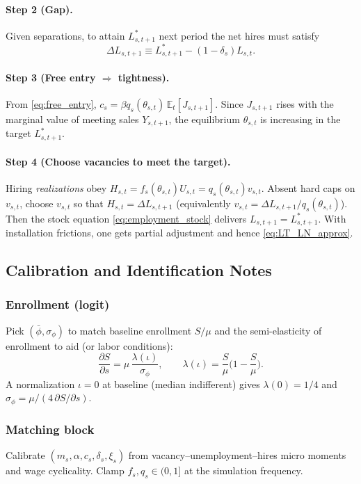 \paragraph{Step 2 (Gap).} Given separations, to attain $L^\ast_{s,t+1}$ next period the net hires must satisfy
\[
\Delta L_{s,t+1}\equiv L^\ast_{s,t+1}-(1-\delta_s)L_{s,t}.
\]

\paragraph{Step 3 (Free entry $\Rightarrow$ tightness).} From \eqref{eq:free_entry}, $c_s=\beta q_s(\theta_{s,t})\,\mathbb{E}_t[J_{s,t+1}]$. Since $J_{s,t+1}$ rises with the marginal value of meeting sales $Y_{s,t+1}$, the equilibrium $\theta_{s,t}$ is increasing in the target $L^\ast_{s,t+1}$.

\paragraph{Step 4 (Choose vacancies to meet the target).} Hiring \emph{realizations} obey $H_{s,t}=f_s(\theta_{s,t})U_{s,t}=q_s(\theta_{s,t})v_{s,t}$. Absent hard caps on $v_{s,t}$, choose $v_{s,t}$ so that $H_{s,t}=\Delta L_{s,t+1}$ (equivalently $v_{s,t}=\Delta L_{s,t+1}/q_s(\theta_{s,t})$). Then the stock equation \eqref{eq:employment_stock} delivers $L_{s,t+1}=L^\ast_{s,t+1}$. With installation frictions, one gets partial adjustment and hence \eqref{eq:LT_LN_approx}.

\subsection*{Calibration and Identification Notes}
\subsubsection*{Enrollment (logit)}
Pick $(\bar\phi,\sigma_\phi)$ to match baseline enrollment $S/\mu$ and the semi-elasticity of enrollment to aid (or labor conditions):
\[
\frac{\partial S}{\partial s}=\mu\,\frac{\lambda(\iota)}{\sigma_\phi},\qquad \lambda(\iota)=\frac{S}{\mu}\Big(1-\frac{S}{\mu}\Big).
\]
A normalization $\iota=0$ at baseline (median indifferent) gives $\lambda(0)=1/4$ and $\sigma_\phi=\mu/(4\,\partial S/\partial s)$.

\subsubsection*{Matching block}
Calibrate $(m_s,\alpha,c_s,\delta_s,\xi_s)$ from vacancy–unemployment–hires micro moments and wage cyclicality. Clamp $f_s,q_s\in(0,1]$ at the simulation frequency.

